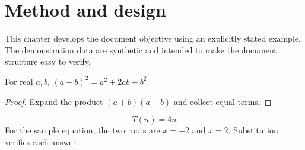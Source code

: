 \chapter{Method and design}


\label{sec:chapter2}
This chapter develops the document objective using an explicitly stated example. The demonstration data are synthetic and intended to make the document structure easy to verify.

\begin{demotheorem}
For real $a,b$, $(a+b)^2=a^2+2ab+b^2$.
\end{demotheorem}
\begin{proof}
Expand the product $(a+b)(a+b)$ and collect equal terms.
\end{proof}
\[T(n)=4n\]
For the sample equation, the two roots are $x=-2$ and $x=2$. Substitution verifies each answer.
